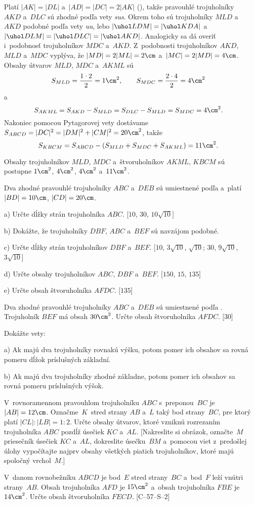 {%
Platí $|AK| = |DL|$ a~$|AD| = |DC| = 2 |AK|$ (\obr), takže pravouhlé trojuholníky
$AKD$ a~$DLC$ sú zhodné podľa vety {\it sus}. Okrem toho sú trojuholníky $MLD$
a~$AKD$ podobné podľa vety {\it uu},
lebo $|\uhol LDM| =|\uhol KDA|$ a~$|\uhol DLM| =|\uhol DLC| =|\uhol AKD|$.
Analogicky sa dá overiť i~podobnosť trojuholníkov $MDC$
a~$AKD$. Z~podobnosti trojuholníkov $AKD$, $MLD$ a~$MDC$ vyplýva, že
$|MD| = 2|ML| = 2\cm$ a~$|MC| = 2|MD| = 4\cm$. Obsahy útvarov $MLD$, $MDC$ a~$AKML$ sú
$$
S_{MLD} ={1\cdot2\over2} = 1\cm^2,\qquad S_{MDC} ={2\cdot4\over2} = 4\cm^2
$$
a~$$
S_{AKML} = S_{AKD} - S_{MLD} = S_{DLC} - S_{MLD} = S_{MDC} = 4\cm^2.
$$
Nakoniec pomocou Pytagorovej vety dostávame
$S_{ABCD} = |DC|^2 = |DM|^2 + |CM|^2 =20\cm^2$, takže
$$
S_{KBCM} = S_{ABCD} - (S_{MLD} + S_{MDC} + S_{AKML}) =11\cm^2.
$$

\zaver
 Obsahy trojuholníkov $MLD$, $MDC$ a~štvoruholníkov
$AKML$, $KBCM$ sú postupne $1\cm^{2}$, $4\cm^{2}$, $4\cm^{2}$  a~$11\cm^{2}$.
\ifrocenka{}\else{}\fi%

Dva zhodné pravouhlé trojuholníky $ABC$ a~$DEB$ sú
umiestnené podľa \obr{} a~platí $|BD| = 10\cm$, $|CD| = 20\cm$.
\item{a)} Určte dĺžky strán trojuholníka $ABC$.  [$10$, $30$, $10\sqrt{10}$]
\item{b)} Dokážte, že trojuholníky $DBF$, $ABC$ a~$BEF$ sú navzájom podobné.
\item{c)} Určte dĺžky strán trojuholníkov $DBF$ a~$BEF$.
        [$10$, $3\sqrt{10}$, $\sqrt{10}$; 30, $9\sqrt{10}$, $3\sqrt{10}$]
\item{d)} Určte obsahy trojuholníkov $ABC$, $DBF$ a~$BEF$. [$150$, $15$, $135$]
        \vadjust{\nobreak}%
\item{e)} Určte obsah štvoruholníka $AFDC$. [$135$]

Dva zhodné pravouhlé trojuholníky $ABC$ a~$DEB$ sú
umiestnené podľa . Trojuholník $BEF$ má obsah $30\cm^2$.
Určte obsah štvoruholníka $AFDC$. [$30$]

Dokážte vety:
\item{a)} Ak majú dva trojuholníky rovnakú výšku, potom pomer ich obsahov sa
        rovná pomeru dĺžok príslušných základní.
\item{b)} Ak majú dva trojuholníky zhodné základne, potom pomer ich obsahov
        sa rovná pomeru príslušných výšok.

V~rovnoramennom pravouhlom trojuholníku $ABC$ s~preponou~$BC$ je $|AB| = 12\cm$.
Označme~$K$~stred strany $AB$ a~$L$ taký bod strany~$BC$, pre ktorý
platí $|CL|:|LB| = 1:2$.
   Určte obsahy útvarov, ktoré vzniknú rozrezaním trojuholníka
$ABC$ pozdĺž úsečiek $KC$ a~$AL$. [Nakreslite si
obrázok, označte~$M$ priesečník úsečiek $KC$ a~$AL$,
dokreslite úsečku~$BM$ a~pomocou viet z~predošlej úlohy vypočítajte
najprv obsahy všetkých piatich trojuholníkov, ktoré majú spoločný vrchol~$M$.]

V~danom rovnobežníku $ABCD$ je bod~$E$ stred strany~$BC$ a~bod~$F$ leží
vnútri strany~$AB$. Obsah trojuholníka $AFD$ je $15\cm^2$ a~obsah
trojuholníka $FBE$ je $14\cm^2$. Určte obsah štvoruholníka $FECD$.  [C--57--S--2]
}

